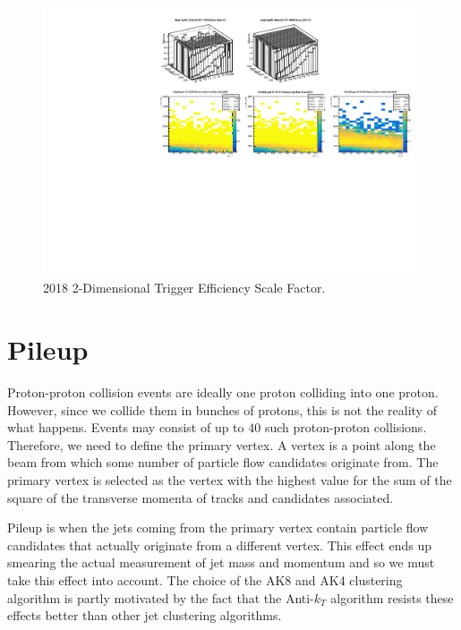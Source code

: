 \begin{figure}[!htb]
	\centering
	\includegraphics[width=1.0\textwidth]{Figures/2018triggerMaps.pdf}
	\caption{2018 2-Dimensional Trigger Efficiency Scale Factor.}
	\label{fig:fig_3-6}
\end{figure}
\clearpage

\section{Pileup}

Proton-proton collision events are ideally one proton colliding into one proton. 
However, since we collide them in bunches of protons, this is not the reality of what happens.
Events may consist of up to 40 such proton-proton collisions. Therefore, we need to define the primary vertex.
A vertex is a point along the beam from which some number of particle flow candidates originate from.
The primary vertex is selected as the vertex with the highest value for the sum of the square of the transverse momenta of tracks and candidates associated.

Pileup is when the jets coming from the primary vertex contain particle flow candidates that actually originate from a different vertex.
This effect ends up smearing the actual measurement of jet mass and momentum and so we must take this effect into account.
The choice of the AK8 and AK4 clustering algorithm is partly motivated by the fact that the Anti-$k_T$ algorithm resists these effects better than other jet clustering algorithms.
